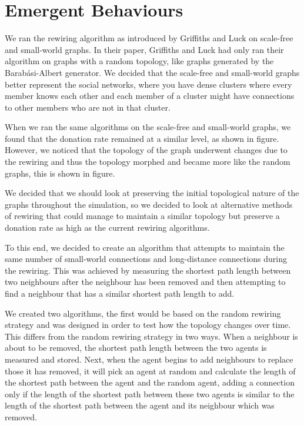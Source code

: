 \section{Emergent Behaviours}

We ran the rewiring algorithm as introduced by Griffiths and Luck on scale-free and small-world graphs. In their paper, Griffiths and Luck had only ran their algorithm on graphs with a random topology, like graphs generated by the Barab\'{a}si-Albert generator. We decided that the scale-free and small-world graphs better represent the social networks, where you have dense clusters where every member knows each other and each member of a cluster might have connections to other members who are not in that cluster.

When we ran the same algorithms on the scale-free and small-world graphs, we found that the donation rate remained at a similar level, as shown in figure. However, we noticed that the topology of the graph underwent changes due to the rewiring and thus the topology morphed and became more like the random graphs, this is shown in figure.

We decided that we should look at preserving the initial topological nature of the graphs throughout the simulation, so we decided to look at alternative methods of rewiring that could manage to maintain a similar topology but preserve a donation rate as high as the current rewiring algorithms.

To this end, we decided to create an algorithm that attempts to maintain the same number of small-world connections and long-distance connections during the rewiring. This was achieved by measuring the shortest path length between two neighbours after the neighbour has been removed and then attempting to find a neighbour that has a similar shortest path length to add.

We created two algorithms, the first would be based on the random rewiring strategy and was designed in order to test how the topology changes over time. This differs from the random rewiring strategy in two ways. When a neighbour is about to be removed, the shortest path length between the two agents is measured and stored. Next, when the agent begins to add neighbours to replace those it has removed, it will pick an agent at random and calculate the length of the shortest path between the agent and the random agent, adding a connection only if the length of the shortest path between these two agents is similar to the length of the shortest path between the agent and its neighbour which was removed.


